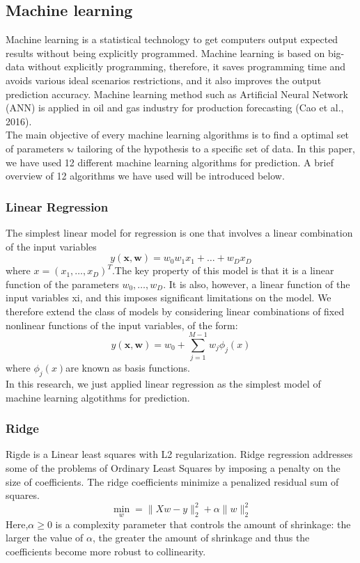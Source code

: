 \documentclass[english]{article}
\begin{document}
\subsection{Machine learning}
Machine learning is a statistical technology to get computers output expected results without being explicitly programmed. Machine learning is based on big-data without explicitly programming, therefore, it saves programming time and avoids various ideal scenarios restrictions, and it also improves the output prediction accuracy. Machine learning method such as Artificial Neural Network (ANN) is applied in oil and gas industry for production forecasting \cite{Cao}(Cao et al., 2016).\\
The main objective of every machine learning algorithms is to find a optimal set of parameters $\mathbb{w}$ tailoring of the hypothesis to a specific set of data.
In this paper, we have used 12 different machine learning algorithms for prediction. A brief overview of 12 algorithms we have used will be introduced below.
\subsubsection{Linear Regression}
The simplest linear model for regression is one that involves a linear combination of
the input variables\cite{Bishop}
\begin{equation}
y(\textbf{x}, \textbf{w}) = w_{0} w_{1}x_{1} + \ldots + w_{D}x_{D} 
\end{equation}
where $x = (x_{1},\ldots,x_{D})^{T}$.The key property of this model is that it is a linear function of the parameters $w_{0} , \ldots, w_{D}$. It is also, however, a linear function of the input variables xi, and this imposes significant limitations on the model. We therefore extend the class of models by considering linear combinations of fixed nonlinear functions of the input variables, of the form:
\begin{equation}
y(\textbf{x}, \textbf{w}) =  w_{0} + \sum_{j=1}^{M-1} w_{j}\phi_{j}(x)
\end{equation}
where $\phi_{j} (x)$are known as basis functions.\\
In this research, we just applied linear regression as the simplest model of machine learning algotithms for prediction.
\subsubsection{Ridge}
Rigde is a Linear least squares with L2 regularization. Ridge regression addresses some of the problems of Ordinary Least Squares by imposing a penalty on the size of coefficients. The ridge coefficients minimize a penalized residual sum of squares.\cite{sklearn}
\begin{equation}
\min_{w} = \parallel Xw - y \parallel_{2}^2 +\alpha\parallel w \parallel_{2}^2
\end{equation}
Here,$\alpha \ge 0 $ is a complexity parameter that controls the amount of shrinkage: the larger the value of $\alpha$, the greater the amount of shrinkage and thus the coefficients become more robust to collinearity.
\end{document}
